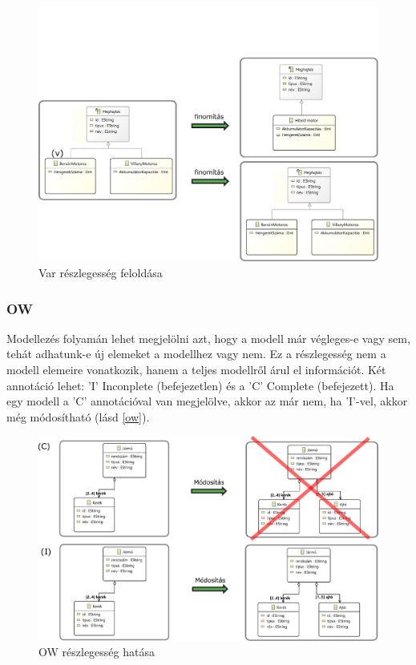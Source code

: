 \begin{figure}[htp]
	\centering
	\includegraphics[width=130mm, keepaspectratio]{figures/var.pdf}
	\caption{Var részlegesség feloldása} 
	\label{var}
\end{figure}

\subsubsection{OW}
Modellezés folyamán lehet megjelölni azt, hogy a modell már végleges-e vagy sem, tehát adhatunk-e új elemeket a modellhez vagy nem. Ez a részlegesség nem a modell elemeire vonatkozik, hanem a teljes modellről árul el információt. Két annotáció lehet: \textsf{’I’} Inconplete (befejezetlen) és a \textsf{’C’} Complete (befejezett). Ha egy modell a \textsf{’C’} annotációval van megjelölve, akkor az már nem, ha \textsf{’I’}-vel, akkor még módosítható (lásd \autoref{ow}).

\begin{figure}[htp]
	\centering
	\includegraphics[width=130mm, keepaspectratio]{figures/ow.pdf}
	\caption{OW részlegesség hatása} 
	\label{ow}
\end{figure}